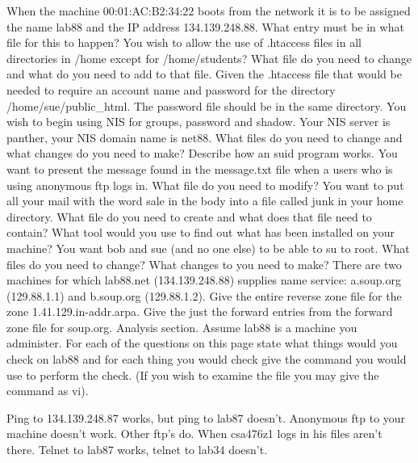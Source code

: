 \vskip 0.5in
\ques
When the machine {\ltt{}00:01:AC:B2:34:22} boots from the network
it is to be assigned the name {\ltt{}lab88} and the IP address
{\ltt{}134.139.248.88}.
What entry must be in what file for this to happen?
\vskip 1.8in
\ques
You wish to allow the use of {\ltt{}.htaccess} files in all directories
in {\ltt{}/home} except for {\ltt{}/home/students}?
What file do you need to change and what do you need to add to that file.
\vskip 2.8in
\ques
Given the {\ltt{}.htaccess} file that would be needed to require an
account name and password for the directory {\ltt{}/home/sue/public_html}.
The password file should be in the same directory.
\vskip 2.4in
\vfill\eject
\ques
You wish to begin using NIS for groups, password and shadow.
Your NIS server is {\ltt{}panther}, your NIS domain name is {\ltt{}net88}.
What files do you need to change and what changes do you need to make?
\vskip 1.8in
\ques
Describe how an suid program works.
\vskip 1.2in
\ques
You want to present the message found in the {\ltt{}message.txt} file
when a users who is using anonymous ftp logs in.
What file do you need to modify?
\vskip 0.8in
\ques
You want to put all your mail with the word {\ltt{}sale} in the
body into a file called {\ltt{}junk} in your home directory.
What file do you need to create and what does that file need to contain?
\vskip 1.6in
\vfill\eject
\ques
What tool would you use to find out what has been installed on your machine?
\vskip 0.7in
\ques
You want {\ltt{}bob} and {\ltt{}sue} (and no one else) to be able to {\ltt{}su}
to {\ltt{}root}.
What files do you need to change?
What changes to you need to make?
\vskip 1.6in
\ques
There are two machines for which {\ltt{}lab88.net} ({\ltt{}134.139.248.88})
supplies name service:
{\ltt{}a.soup.org} ({\ltt{}129.88.1.1}) and 
{\ltt{}b.soup.org} ({\ltt{}129.88.1.2}).
Give the entire reverse zone file for the zone {\ltt{}1.41.129.in-addr.arpa}.
\vskip 3.5in
\ques
Give the just the forward entries from the forward zone file for
{\ltt{}soup.org}.
\vskip 1.2in
\vfill\eject
Analysis section. Assume {\ltt{}lab88} is a machine you administer.
For each of the questions on this page
state what things would you check on {\ltt{}lab88}
and for each thing you would check give the command you would use to
perform the check. (If you wish to examine the file you may give the
command as {\ltt{}vi}).

\ques
Ping to {\ltt{}134.139.248.87} works, but ping to {\ltt{}lab87} doesn't.
\vfill
\ques
Anonymous ftp to your machine doesn't work.
Other ftp's do.
\vfill
\ques
When {\ltt{}csa476z1} logs in his files aren't there.
\vfill
\ques
Telnet to {\ltt{}lab87} works, telnet to {\ltt{}lab34} doesn't.
\bye
